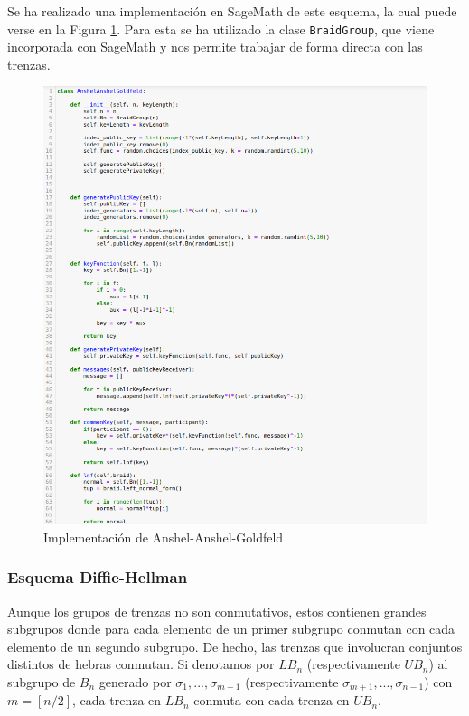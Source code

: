 \documentclass[12pt]{book}
\theoremstyle{definition}
\begin{document}
Se ha realizado una implementación en SageMath de este esquema, la cual puede verse en la Figura \ref{img:imp_anshel}. Para esta se ha utilizado la clase \texttt{BraidGroup}, que viene incorporada con SageMath y nos permite trabajar de forma directa con las trenzas.

\begin{figure}
\includegraphics[scale=0.5]{imgs/Anshel.png}
\caption{Implementación de Anshel-Anshel-Goldfeld}
\label{img:imp_anshel}
\end{figure}



\subsubsection*{Esquema Diffie-Hellman} Aunque los grupos de trenzas no son conmutativos, estos contienen grandes subgrupos donde para cada elemento de un primer subgrupo conmutan con cada elemento de un segundo subgrupo. De hecho, las trenzas que involucran conjuntos distintos de hebras conmutan. Si denotamos por $LB_n$ (respectivamente $UB_n$) al subgrupo de $B_n$ generado por $\sigma_1,...,\sigma_{m-1}$ (respectivamente $\sigma_{m+1},...,\sigma_{n-1}$) con $m=[n/2]$, cada trenza en $LB_n$ conmuta con cada trenza en $UB_n$.
\end{document}
